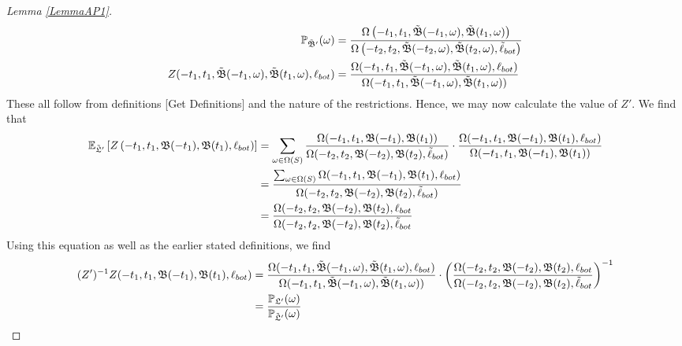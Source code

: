 \begin{proof}[Lemma \ref{LemmaAP1}]
\begin{equation*}
\begin{split}
\mathbb{P}_{\tilde{\mathfrak{B}}'}(\omega)&=\frac{\Omega\left(-t_1,t_1,\tilde{\mathfrak{B}}(-t_1,\omega),\tilde{\mathfrak{B}}(t_1,\omega)\right)}{\Omega\left(-t_2,t_2,\tilde{\mathfrak{B}}(-t_2,\omega),\tilde{\mathfrak{B}}(t_2,\omega),\tilde\ell_{bot}\right)}\\
Z(-t_1,t_1,\tilde{\mathfrak{B}}(-t_1,\omega),\tilde{\mathfrak{B}}(t_1,\omega),\ell_{bot})&=\frac{\Omega(-t_1,t_1,\tilde{\mathfrak{B}}(-t_1,\omega),\tilde{\mathfrak{B}}(t_1,\omega),\ell_{bot})}{\Omega(-t_1,t_1,\tilde{\mathfrak{B}}(-t_1,\omega),\tilde{\mathfrak{B}}(t_1,\omega))}
	\end{split}
	\end{equation*}
	These all follow from definitions [Get Definitions] and the nature of the restrictions. Hence, we may now calculate the value of $Z'$. We find that
	\begin{equation*}
	\begin{split}
	\mathbb{E}_{\tilde{\mathfrak{L}}'}\left[Z\left(-t_1, t_1, \mathfrak B(-t_1), \mathfrak B(t_1), \ell_{bot}\right)\right]&=\sum_{\omega\in \Omega(S)}\frac{\Omega(-t_1,t_1,\mathfrak{B}(-t_1),\mathfrak{B}(t_1))}{\Omega(-t_2,t_2,\mathfrak{B}(-t_2),\mathfrak{B}(t_2),\tilde\ell_{bot})}\cdot\frac{\Omega(-t_1,t_1,\mathfrak B(-t_1),\mathfrak{B}(t_1),\ell_{bot})}{\Omega(-t_1,t_1,\mathfrak{B}(-t_1),\mathfrak B(t_1))}\\
	&=\frac{\sum_{\omega\in\Omega(S)}\Omega(-t_1,t_1,\mathfrak B(-t_1),\mathfrak B(t_1),\ell_{bot})}{\Omega(-t_2,t_2,\mathfrak B(-t_2),\mathfrak B(t_2),\tilde{\ell}_{bot})}\\
	&=\frac{\Omega(-t_2,t_2,\mathfrak B(-t_2),\mathfrak B(t_2),\ell_{bot}}{\Omega(-t_2,t_2,\mathfrak B(-t_2),\mathfrak B(t_2),\tilde{\ell}_{bot}}
	\end{split}
	\end{equation*}
	Using this equation as well as the earlier stated definitions, we find \begin{equation*}
	\begin{split}
(Z')^{-1}Z(-t_1,t_1,\mathfrak{B}(-t_1),\mathfrak{B}(t_1),\ell_{bot})&=\frac{\Omega(-t_1,t_1,\tilde{\mathfrak{B}}(-t_1,\omega),\tilde{\mathfrak{B}}(t_1,\omega),\ell_{bot})}{\Omega(-t_1,t_1,\tilde{\mathfrak{B}}(-t_1,\omega),\tilde{\mathfrak{B}}(t_1,\omega))}\cdot \left(\frac{\Omega(-t_2,t_2,\mathfrak B(-t_2),\mathfrak B(t_2),\ell_{bot}}{\Omega(-t_2,t_2,\mathfrak B(-t_2),\mathfrak B(t_2),\tilde{\ell}_{bot}}\right)^{-1}\\
&=\frac{\pr_{\mathfrak L'}(\omega)}{\pr_{\tilde{\mathfrak L}'}(\omega)}
	\end{split}

\end{equation*}
\end{proof}
